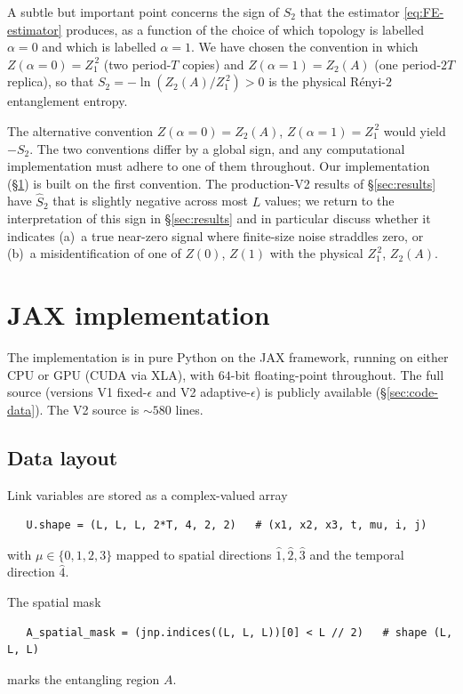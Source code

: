 \documentclass[11pt,a4paper]{article}
\theoremstyle{definition}
\begin{document}
A subtle but important point concerns the sign of $S_2$ that the
estimator \eqref{eq:FE-estimator} produces, as a function of the
choice of which topology is labelled $\alpha = 0$ and which is
labelled $\alpha = 1$. We have chosen the convention in which
$Z(\alpha = 0) = Z_1^{\,2}$ (two period-$T$ copies) and
$Z(\alpha = 1) = Z_2(A)$ (one period-$2T$ replica), so that
$S_2 = -\ln(Z_2(A)/Z_1^{\,2}) > 0$ is the physical Rényi-$2$
entanglement entropy.

The alternative convention $Z(\alpha = 0) = Z_2(A)$,
$Z(\alpha = 1) = Z_1^{\,2}$ would yield $-S_2$. The two conventions
differ by a global sign, and any computational implementation must
adhere to one of them throughout. Our implementation
(\S\ref{sec:impl}) is built on the first convention. The
production-V2 results of \S\ref{sec:results} have
$\widehat S_2$ that is slightly negative across most $L$ values; we
return to the interpretation of this sign in \S\ref{sec:results} and
in particular discuss whether it indicates (a)~a true near-zero
signal where finite-size noise straddles zero, or
(b)~a misidentification of one of $Z(0)$, $Z(1)$ with the
physical $Z_1^{\,2}$, $Z_2(A)$.

\section{JAX implementation}
\label{sec:impl}

The implementation is in pure Python on the JAX
\cite{JAX2018} framework, running on either CPU or GPU (CUDA via
XLA), with $64$-bit floating-point throughout. The full source
(versions V1 fixed-$\epsilon$ and V2 adaptive-$\epsilon$) is
publicly available (\S\ref{sec:code-data}). The V2 source is
$\sim 580$ lines.

\subsection{Data layout}

Link variables are stored as a complex-valued array
\begin{verbatim}
   U.shape = (L, L, L, 2*T, 4, 2, 2)   # (x1, x2, x3, t, mu, i, j)
\end{verbatim}
with $\mu \in \{0,1,2,3\}$ mapped to spatial directions $\hat 1, \hat
2, \hat 3$ and the temporal direction $\hat 4$.

The spatial mask
\begin{verbatim}
   A_spatial_mask = (jnp.indices((L, L, L))[0] < L // 2)   # shape (L, L, L)
\end{verbatim}
marks the entangling region $A$.
\end{document}
